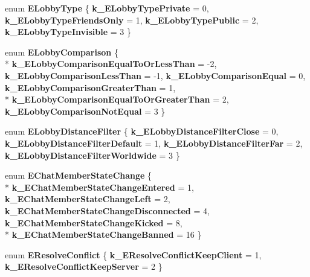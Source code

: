 \begin{DoxyCompactItemize}
\item 
\hypertarget{namespaceValve_1_1Steamworks_a0a120aeddfa1362e71f97121024a6f49}{}enum {\bfseries E\+Lobby\+Type} \{ {\bfseries k\+\_\+\+E\+Lobby\+Type\+Private} = 0, 
{\bfseries k\+\_\+\+E\+Lobby\+Type\+Friends\+Only} = 1, 
{\bfseries k\+\_\+\+E\+Lobby\+Type\+Public} = 2, 
{\bfseries k\+\_\+\+E\+Lobby\+Type\+Invisible} = 3
 \}\label{namespaceValve_1_1Steamworks_a0a120aeddfa1362e71f97121024a6f49}

\item 
\hypertarget{namespaceValve_1_1Steamworks_a0c06ec5c97875fe513e82a7637c00e23}{}enum {\bfseries E\+Lobby\+Comparison} \{ \\*
{\bfseries k\+\_\+\+E\+Lobby\+Comparison\+Equal\+To\+Or\+Less\+Than} = -\/2, 
{\bfseries k\+\_\+\+E\+Lobby\+Comparison\+Less\+Than} = -\/1, 
{\bfseries k\+\_\+\+E\+Lobby\+Comparison\+Equal} = 0, 
{\bfseries k\+\_\+\+E\+Lobby\+Comparison\+Greater\+Than} = 1, 
\\*
{\bfseries k\+\_\+\+E\+Lobby\+Comparison\+Equal\+To\+Or\+Greater\+Than} = 2, 
{\bfseries k\+\_\+\+E\+Lobby\+Comparison\+Not\+Equal} = 3
 \}\label{namespaceValve_1_1Steamworks_a0c06ec5c97875fe513e82a7637c00e23}

\item 
\hypertarget{namespaceValve_1_1Steamworks_a949755a3443dab62f085efe79b6da1e3}{}enum {\bfseries E\+Lobby\+Distance\+Filter} \{ {\bfseries k\+\_\+\+E\+Lobby\+Distance\+Filter\+Close} = 0, 
{\bfseries k\+\_\+\+E\+Lobby\+Distance\+Filter\+Default} = 1, 
{\bfseries k\+\_\+\+E\+Lobby\+Distance\+Filter\+Far} = 2, 
{\bfseries k\+\_\+\+E\+Lobby\+Distance\+Filter\+Worldwide} = 3
 \}\label{namespaceValve_1_1Steamworks_a949755a3443dab62f085efe79b6da1e3}

\item 
\hypertarget{namespaceValve_1_1Steamworks_a2d20642a576fc47c2ae37276510f31d3}{}enum {\bfseries E\+Chat\+Member\+State\+Change} \{ \\*
{\bfseries k\+\_\+\+E\+Chat\+Member\+State\+Change\+Entered} = 1, 
{\bfseries k\+\_\+\+E\+Chat\+Member\+State\+Change\+Left} = 2, 
{\bfseries k\+\_\+\+E\+Chat\+Member\+State\+Change\+Disconnected} = 4, 
{\bfseries k\+\_\+\+E\+Chat\+Member\+State\+Change\+Kicked} = 8, 
\\*
{\bfseries k\+\_\+\+E\+Chat\+Member\+State\+Change\+Banned} = 16
 \}\label{namespaceValve_1_1Steamworks_a2d20642a576fc47c2ae37276510f31d3}

\item 
\hypertarget{namespaceValve_1_1Steamworks_a61665a225e7e63198a2154e0438007ee}{}enum {\bfseries E\+Resolve\+Conflict} \{ {\bfseries k\+\_\+\+E\+Resolve\+Conflict\+Keep\+Client} = 1, 
{\bfseries k\+\_\+\+E\+Resolve\+Conflict\+Keep\+Server} = 2
 \}\label{namespaceValve_1_1Steamworks_a61665a225e7e63198a2154e0438007ee}


\end{DoxyCompactItemize}

